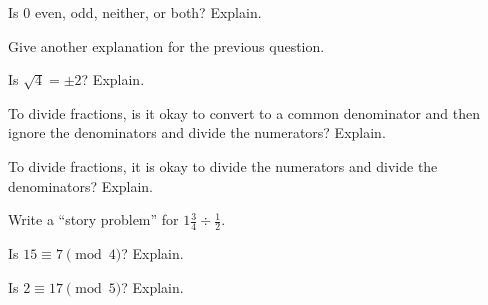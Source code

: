 \documentclass{ximera}
\begin{document}
\begin{question}
Is $0$ even, odd, neither, or both?  Explain.  
\begin{freeResponse}
\end{freeResponse}
\end{question}

\begin{question}
Give another explanation for the previous question.   
\begin{freeResponse}
\end{freeResponse}
\end{question}

\begin{question}
Is $\sqrt{4}=\pm2$?  Explain.  
\begin{freeResponse}
\end{freeResponse}
\end{question}

\begin{question}
To divide fractions, is it okay to convert to a common denominator and then ignore the denominators and divide the numerators?  Explain. 
\begin{freeResponse}
\end{freeResponse}
\end{question}

\begin{question}
To divide fractions, it is okay to divide the numerators and divide the denominators?  Explain.  
\begin{freeResponse}
\end{freeResponse}
\end{question}

\begin{question}
Write a ``story problem'' for $1\frac{3}{4}\div\frac{1}{2}$.  
\begin{freeResponse}
\end{freeResponse}
\end{question}

\begin{question}
Is $15 \equiv 7 \pmod 4$?  Explain.  
\begin{freeResponse}
\end{freeResponse}
\end{question}

\begin{question}
Is $2 \equiv 17 \pmod 5$?  Explain.  
\begin{freeResponse}
\end{freeResponse}
\end{question}
\end{document}
